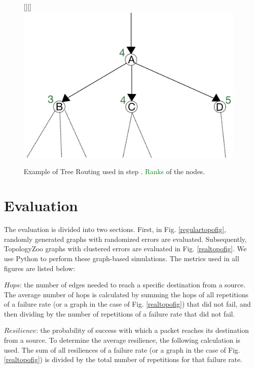 \documentclass[conference]{IEEEtran}
\begin{document}
\begin{figure}[t]
    \centering
    \raisebox{0pt}[\height][\depth]{\hspace*{-1cm}\includegraphics[scale=0.15]{figures/treeRoutingExample.jpg}}
    \caption{Example of Tree Routing used in step . \textcolor{green}{Ranks} of the nodes.}

    \label{treeRoutingExample}
\end{figure}

\section{Evaluation}
\label{evaluation}

The evaluation is divided into two sections. First, in Fig. \ref{regulartopofig}, randomly generated graphs with randomized errors are evaluated. Subsequently, TopologyZoo \cite{topologyZoo} graphs with clustered errors are evaluated in Fig. \ref{realtopofig}.
We use Python to perform these graph-based simulations.
The metrics used in all figures are listed below:

$Hops$: the number of edges needed to reach a specific destination from a source. The average number of hops is calculated by summing the hops of all repetitions of a failure rate (or a graph in the case of Fig. \ref{realtopofig}) that did not fail, and then dividing by the number of repetitions of a failure rate that did not fail.

$Resilience$: the probability of success with which a packet reaches its destination from a source. To determine the average resilience, the following calculation is used. The sum of all resiliences of a failure rate (or a graph in the case of Fig. \ref{realtopofig}) is divided by the total number of repetitions for that failure rate.
\end{document}

